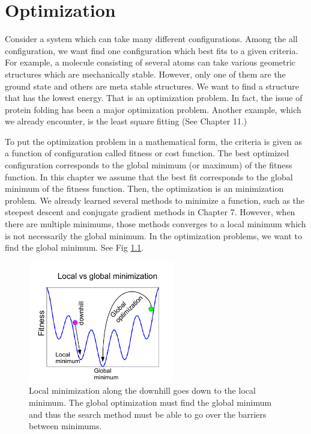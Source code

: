 \chapter{Optimization}\label{ch:optimization}

Consider a system which can take many different configurations.  Among the all configuration, we want find one configuration which best fits to a given criteria. For example, a molecule consisting of several atoms can take various geometric structures which are mechanically stable.  However, only one of them are the ground state and others are meta stable structures.  We want to find a structure that has the lowest energy.  That is an optimization problem.  In fact, the issue of protein folding has been a major optimization problem.\cite{protein_folding}  Another example, which we already encounter, is the least square fitting (See Chapter 11.)

To put the optimization problem in a mathematical form, the criteria is given as a function of configuration called fitness or cost function.  The best optimized configuration corresponds to the global minimum (or maximum) of the fitness function.  In this chapter we assume that the best fit corresponds to the global minimum of the fitness function.  Then, the optimization is an minimization problem.  We already learned several methods to minimize a function,  such as the steepest descent and conjugate gradient methods in Chapter 7.  However, when there are multiple minimums, those methods converges to a local minimum which is not necessarily the global minimum.  In the optimization problems, we want to find the global minimum. See Fig \ref{fig:local_minimum}.

\begin{figure}
\centering
\includegraphics[width=2.5in]{19.Optimization/local_minimum.pdf}
\caption{Local minimization along the downhill goes down to the local minimum.  The global optimization must find the global minimum and thus the  search method must be able to go over the barriers between minimums.}
\label{fig:local_minimum}
\end{figure}

